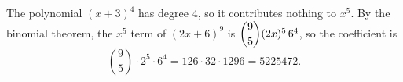 The polynomial $(x+3)^4$ has degree $4$, so it contributes nothing to $x^5$. By the binomial theorem, the $x^5$ term of $(2x+6)^9$ is $\dbinom95(2x)^5\,6^4$, so the coefficient is
\[\binom95\cdot2^5\cdot6^4=126\cdot32\cdot1296=\boxed{5225472}.\]

